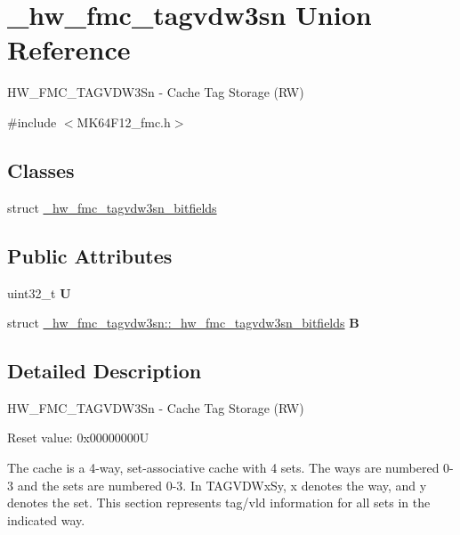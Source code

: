 \hypertarget{union__hw__fmc__tagvdw3sn}{}\section{\+\_\+hw\+\_\+fmc\+\_\+tagvdw3sn Union Reference}
\label{union__hw__fmc__tagvdw3sn}


H\+W\+\_\+\+F\+M\+C\+\_\+\+T\+A\+G\+V\+D\+W3\+Sn -\/ Cache Tag Storage (RW)  




{\ttfamily \#include $<$M\+K64\+F12\+\_\+fmc.\+h$>$}

\subsection*{Classes}
\begin{DoxyCompactItemize}
\item 
struct \hyperlink{struct__hw__fmc__tagvdw3sn_1_1__hw__fmc__tagvdw3sn__bitfields}{\+\_\+hw\+\_\+fmc\+\_\+tagvdw3sn\+\_\+bitfields}
\end{DoxyCompactItemize}
\subsection*{Public Attributes}
\begin{DoxyCompactItemize}
\item 
uint32\+\_\+t {\bfseries U}\hypertarget{union__hw__fmc__tagvdw3sn_ae04453a68b133321c18395639d1927b2}{}\label{union__hw__fmc__tagvdw3sn_ae04453a68b133321c18395639d1927b2}

\item 
struct \hyperlink{struct__hw__fmc__tagvdw3sn_1_1__hw__fmc__tagvdw3sn__bitfields}{\+\_\+hw\+\_\+fmc\+\_\+tagvdw3sn\+::\+\_\+hw\+\_\+fmc\+\_\+tagvdw3sn\+\_\+bitfields} {\bfseries B}\hypertarget{union__hw__fmc__tagvdw3sn_a36c929021443c7053081606ca82ce005}{}\label{union__hw__fmc__tagvdw3sn_a36c929021443c7053081606ca82ce005}

\end{DoxyCompactItemize}


\subsection{Detailed Description}
H\+W\+\_\+\+F\+M\+C\+\_\+\+T\+A\+G\+V\+D\+W3\+Sn -\/ Cache Tag Storage (RW) 

Reset value\+: 0x00000000U

The cache is a 4-\/way, set-\/associative cache with 4 sets. The ways are numbered 0-\/3 and the sets are numbered 0-\/3. In T\+A\+G\+V\+D\+Wx\+Sy, x denotes the way, and y denotes the set. This section represents tag/vld information for all sets in the indicated way. 

